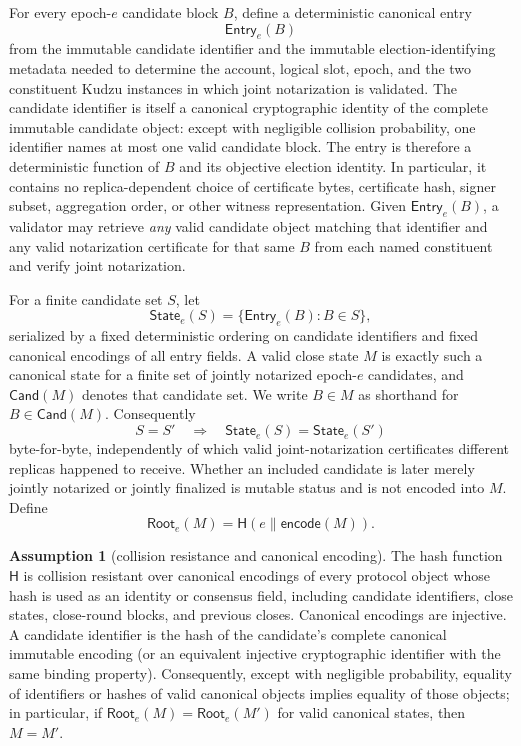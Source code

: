 \documentclass[11pt]{article}
\theoremstyle{definition}
\newtheorem{assumption}[theorem]{Assumption}
\theoremstyle{remark}
\newcommand{\Root}{\mathsf{Root}}
\newcommand{\State}{\mathsf{State}}
\newcommand{\Entry}{\mathsf{Entry}}
\newcommand{\Cand}{\mathsf{Cand}}
\newcommand{\hash}{\mathsf{H}}
\begin{document}
For every epoch-$e$ candidate block $B$, define a deterministic canonical entry
\[
  \Entry_e(B)
\]
from the immutable candidate identifier and the immutable election-identifying metadata needed to determine the account, logical slot, epoch, and the two constituent Kudzu instances in which joint notarization is validated. The candidate identifier is itself a canonical cryptographic identity of the complete immutable candidate object: except with negligible collision probability, one identifier names at most one valid candidate block. The entry is therefore a deterministic function of $B$ and its objective election identity. In particular, it contains no replica-dependent choice of certificate bytes, certificate hash, signer subset, aggregation order, or other witness representation. Given $\Entry_e(B)$, a validator may retrieve \emph{any} valid candidate object matching that identifier and any valid notarization certificate for that same $B$ from each named constituent and verify joint notarization.

For a finite candidate set $S$, let
\[
  \State_e(S)=\{\Entry_e(B):B\in S\},
\]
serialized by a fixed deterministic ordering on candidate identifiers and fixed canonical encodings of all entry fields. A valid close state $M$ is exactly such a canonical state for a finite set of jointly notarized epoch-$e$ candidates, and $\Cand(M)$ denotes that candidate set. We write $B\in M$ as shorthand for $B\in\Cand(M)$. Consequently
\[
  S=S'\quad\Longrightarrow\quad \State_e(S)=\State_e(S')
\]
byte-for-byte, independently of which valid joint-notarization certificates different replicas happened to receive. Whether an included candidate is later merely jointly notarized or jointly finalized is mutable status and is not encoded into $M$. Define
\[
  \Root_e(M)=\hash(e\parallel\mathsf{encode}(M)).
\]

\begin{assumption}[collision resistance and canonical encoding]
\label{ass:hash}
The hash function $\hash$ is collision resistant over canonical encodings of every protocol object whose hash is used as an identity or consensus field, including candidate identifiers, close states, close-round blocks, and previous closes. Canonical encodings are injective. A candidate identifier is the hash of the candidate's complete canonical immutable encoding (or an equivalent injective cryptographic identifier with the same binding property). Consequently, except with negligible probability, equality of identifiers or hashes of valid canonical objects implies equality of those objects; in particular, if $\Root_e(M)=\Root_e(M')$ for valid canonical states, then $M=M'$.
\end{assumption}
\end{document}
